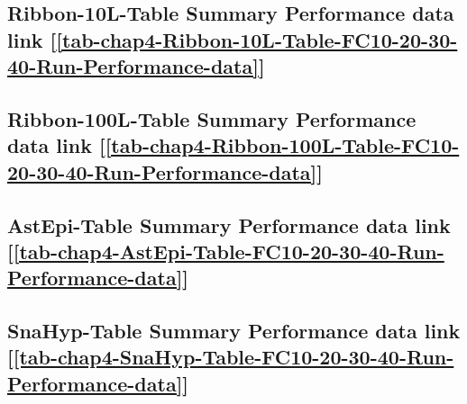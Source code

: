 \subsection      {Ribbon-10L-Table Summary Performance data link
[\ref  {tab-chap4-Ribbon-10L-Table-FC10-20-30-40-Run-Performance-data}] }
\label{ssec-chap4-Ribbon-10L-Table-FC10-20-30-40-Run-Performance-data}

\subsection      {Ribbon-100L-Table Summary Performance data link
[\ref  {tab-chap4-Ribbon-100L-Table-FC10-20-30-40-Run-Performance-data}] }
\label{ssec-chap4-Ribbon-100L-Table-FC10-20-30-40-Run-Performance-data}

\subsection      {AstEpi-Table Summary Performance data link
[\ref  {tab-chap4-AstEpi-Table-FC10-20-30-40-Run-Performance-data}] }
\label{ssec-chap4-AstEpi-Table-FC10-20-30-40-Run-Performance-data}

\subsection      {SnaHyp-Table Summary Performance data link
[\ref  {tab-chap4-SnaHyp-Table-FC10-20-30-40-Run-Performance-data}] }
\label{ssec-chap4-SnaHyp-Table-FC10-20-30-40-Run-Performance-data}

